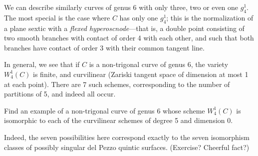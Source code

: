 We can describe similarly curves of genus 6 with only three, two or even one $g^1_4$. The most special is the case where $C$ has only one $g^1_4$; this is the normalization of a plane sextic with a \emph{flexed hyperoscnode}---that is, a double point consisting of two smooth branches with contact of order 4 with each other, and such that both branches have contact of order 3 with their common tangent line.

In general, we see that if $C$ is a non-trigonal curve of genus 6, the variety $W^1_4(C)$ is finite, and curvilinear (Zariski tangent space of dimension at most 1 at each point). There are 7 such schemes, corresponding to the number of partitions of 5, and indeed all occur.

\begin{exercise}
Find an example of a non-trigonal curve of genus 6 whose scheme $W^1_4(C)$ is isomorphic to each of the curvilinear schemes of degree 5 and dimension 0.
\end{exercise}

Indeed, the seven possibilities here correspond exactly to the seven isomorphism classes of possibly singular del Pezzo quintic surfaces. (Exercise? Cheerful fact?)




